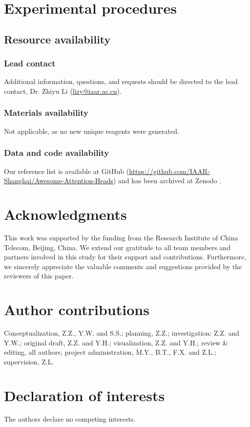 \documentclass[12pt,letterpaper]{article}
\begin{document}
\section*{Experimental procedures}
\subsection*{Resource availability}
\subsubsection*{Lead contact}
Additional information, questions, and requests should be directed to the lead contact, Dr. Zhiyu Li (\href{mailto:lizy@iaar.ac.cn}{lizy@iaar.ac.cn}).
\subsubsection*{Materials availability}
Not applicable, as no new unique reagents were generated.
\subsubsection*{Data and code availability}
Our reference list is available at GitHub (\href{https://github.com/IAAR-Shanghai/Awesome-Attention-Heads}{https://github.com/IAAR-Shanghai/Awesome-Attention-Heads}) and has been archived at Zenodo \citep{GithubRepo}.

\section*{Acknowledgments}
This work was supported by the funding from the Research Institute of China Telecom, Beijing, China. We extend our gratitude to all team members and partners involved in this study for their support and contributions. Furthermore, we sincerely appreciate the valuable comments and suggestions provided by the reviewers of this paper. 

\section*{Author contributions}
Conceptualization, Z.Z., Y.W. and S.S.; planning, Z.Z.; investigation: Z.Z. and Y.W.; original draft, Z.Z. and Y.H.; visualization, Z.Z. and Y.H.; review \& editing, all authors; project administration, M.Y., B.T., F.X. and Z.L.; supervision, Z.L.

\section*{Declaration of interests}
The authors declare no competing interests.


 
\end{document}
